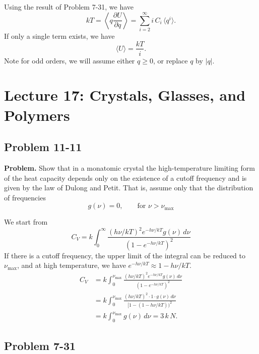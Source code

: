 \documentclass[twocolumn, 10pt]{article}
\numberwithin{equation}{section}
\newenvironment{problem}
{\par\medskip \color{problue}
  \textbf{Problem. }\ignorespaces}
{\medskip}
\newenvironment{solution}[1][\empty]
{\par\medskip\sffamily
  \textbf{\ifx\empty#1{Solution.}\relax\else{#1}\fi} \ignorespaces}
{\medskip}
\begin{document}
\begin{solution}
Using the result of Problem 7-31, we have
$$
kT
=
\left\langle
  q \frac{ \partial U } { \partial q }
\right\rangle
=
\sum_{i = 2}^\infty
  i \, C_i \, \langle q^i \rangle
.
$$
If only a single term exists, we have
$$
  \langle U \rangle = \frac{kT}{i}.
$$
Note for odd orders, we will assume either $q \ge 0$,
or replace $q$ by $|q|$.
\end{solution}

\section{Lecture 17: Crystals, Glasses, and Polymers}

\subsection{Problem 11-11}

\begin{problem}
  Show that in a monatomic crystal the high-temperature limiting form
  of the heat capacity depends only on the existence of a cutoff frequency
  and is given by the law of Dulong and Petit.
  That is, assume only that the distribution of frequencies
  $$
  g(\nu) = 0, \qquad \mbox{for $\nu > \nu_\mathrm{max}$}
  $$
\end{problem}

\begin{solution}
  We start from
  \begin{equation}
    C_V = k
    \int_0^\infty
      \frac{ (h\nu/kT)^2 e^{-h\nu/kT} g(\nu) \, d\nu }
           { (1 - e^{-h\nu/kT})^2 }
    \tag{11-10}
  \end{equation}
  If there is a cutoff frequency, the upper limit of the integral
  can be reduced to $\nu_\mathrm{max}$, and
  at high temperature,
  we have $e^{-h\nu/kT} \approx 1 - h\nu/kT$.
  \begin{align*}
    C_V
    &= k
    \int_0^{\nu_\mathrm{max}}
      \frac{ (h\nu/kT)^2 e^{-h\nu/kT} g(\nu) \, d\nu }
           { (1 - e^{-h\nu/kT})^2 }
    \\
    &= k
    \int_0^{\nu_\mathrm{max}}
      \frac{ (h\nu/kT)^2 \cdot 1 \cdot g(\nu) \, d\nu }
           { [1 - (1-h\nu/kT))^2 }
    \\
    &= k \int_0^{\nu_\mathrm{max}} g(\nu) \, d\nu
    = 3 \, k \, N.
  \end{align*}
\end{solution}

\subsection{Problem 7-31}
\end{document}
